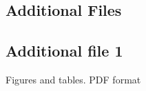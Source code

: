 \documentclass{bmcart}
\begin{document}
\begin{backmatter}






\section*{Additional Files}
  \subsection*{Additional file 1} \label{add:figs_tbls}
    Figures and tables. PDF format


\end{backmatter}
\end{document}
